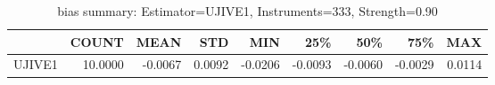 \begin{table}[ht]
\centering
\caption{bias summary: Estimator=UJIVE1, Instruments=333, Strength=0.90}
\begin{tabular}{lrrrrrrrr}
\toprule
 & COUNT & MEAN & STD & MIN & 25\% & 50\% & 75\% & MAX \\
\midrule
UJIVE1 & 10.0000 & -0.0067 & 0.0092 & -0.0206 & -0.0093 & -0.0060 & -0.0029 & 0.0114 \\
\bottomrule
\end{tabular}
\end{table}
